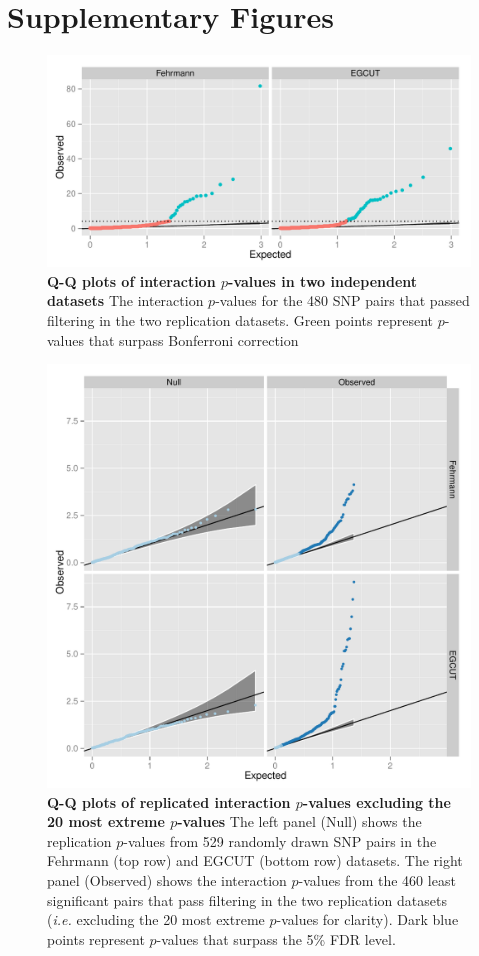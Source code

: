 \documentclass{article}
\begin{document}
\clearpage
\section{Supplementary Figures}
\setcounter{figure}{0}
\makeatletter 
\renewcommand{\thefigure}{S\@arabic\c@figure} 
\makeatletter 

\begin{figure}[H]
\includegraphics[width=5in]{qqbonf}
\caption{\textbf{Q-Q plots of interaction $p$-values in two independent datasets} The interaction $p$-values for the 480 SNP pairs that passed filtering in the two replication datasets. Green points represent $p$-values that surpass Bonferroni correction}
\label{fig:qqplotbonf}
\end{figure}

\begin{figure}
\includegraphics[width=5in]{qqfdr}
\caption{\textbf{Q-Q plots of replicated interaction $p$-values excluding the 20 most extreme $p$-values} The left panel (Null) shows the replication $p$-values from 529 randomly drawn SNP pairs in the Fehrmann (top row) and EGCUT (bottom row) datasets. The right panel (Observed) shows the interaction $p$-values from the 460 least significant pairs that pass filtering in the two replication datasets (\emph{i.e.} excluding the 20 most extreme $p$-values for clarity). Dark blue points represent $p$-values that surpass the 5\% FDR level.}
\label{fig:qqplotfdr}
\end{figure}

\begin{figure}
\caption{\textbf{}}
\end{figure}
\end{document}
